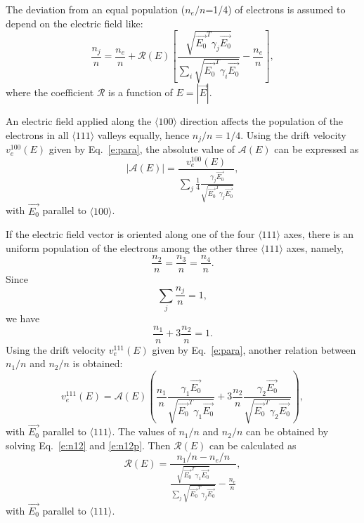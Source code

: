 \documentclass[epj]{svjour}
\begin{document}
The deviation from an equal population ($n_{e}/n$=1/4) of electrons is
assumed to depend on the electric field like:
\begin{equation} 
\label{e:nion} 
\frac{n_{j}}{n} = \frac{n_{e}}{n} + \mathcal{R}(E) 
\left[ \frac{\sqrt{\vec{E_{0}}^{T}\gamma_{j}\vec{E_{0}}}}
{\sum_{i}\sqrt{\vec{E_{0}}^{T}\gamma_{i}\vec{E_{0}}}} - 
\frac{n_{e}}{n} \right],  
\end{equation} 
where the coefficient $\mathcal{R}$ is a function of $E=|\vec{E}|$.
 
An electric field applied along the $\langle 100 \rangle$ direction
affects the population of the electrons in all $\langle 111 \rangle$
valleys equally, hence $n_{j}/n = 1/4$. Using the drift velocity
$v_{e}^{100}(E)$ given by Eq.~\ref{e:para}, the absolute value of
$\mathcal{A}(E)$ can be expressed as
\begin{equation} 
\label{e:ae} 
|\mathcal{A}(E)| = \frac{v_{e}^{100}(E)}  
{\displaystyle \sum_{j} \frac{1}{4} \frac{\gamma_{j}\vec{E_{0}}}
{\sqrt{\vec{E_{0}}^{T}\gamma_{j}\vec{E_{0}}}}}, 
\end{equation}
with $\vec{E_{0}}$ parallel to $\langle 100 \rangle$.
 
If the electric field vector is oriented along one of the four
$\langle 111 \rangle$ axes, there is an uniform population of the
electrons among the other three $\langle 111 \rangle$ axes, namely,
\begin{equation} 
\label{e:n111} 
\frac{n_{2}}{n} = \frac{n_{3}}{n} = \frac{n_{4}}{n}. 
\end{equation} 
Since 
\begin{equation} 
\label{e:nsum} 
\displaystyle \sum_{j}\frac{n_{j}}{n} = 1, 
\end{equation} 
we have 
\begin{equation} 
\label{e:n12} 
\frac{n_{1}}{n} + 3\frac{n_{2}}{n}= 1. 
\end{equation} 
Using the drift velocity $v_{e}^{111}(E)$ given by Eq.~\ref{e:para},
another relation between $n_{1}/n$ and $n_{2}/n$ is obtained:
\begin{equation} 
\label{e:n12p} 
v_{e}^{111}(E) =  \mathcal{A}(E) 
\left( \frac{n_{1}}{n} \frac{\gamma_{1}\vec{E_{0}}} 
{\sqrt{\vec{E_{0}}^{T}\gamma_{1}\vec{E_{0}}}} +  
3\frac{n_{2}}{n} \frac{\gamma_{2}\vec{E_{0}}}         
{\sqrt{\vec{E_{0}}^{T}\gamma_{2}\vec{E_{0}}}} \right), 
\end{equation}
with $\vec{E_{0}}$ parallel to $\langle 111 \rangle$. The values of
$n_{1}/n$ and $n_{2}/n$ can be obtained by solving Eq.~\ref{e:n12} and
\ref{e:n12p}. Then $\mathcal{R}(E)$ can be calculated as
\begin{equation} 
\label{e:re} 
\mathcal{R}(E) = \frac{n_{1}/n - n_{e}/n}
{\displaystyle \frac{\sqrt{\vec{E_{0}}^{T}\gamma_{1}\vec{E_{0}}}}
{\sum_{j}\sqrt{\vec{E_{0}}^{T}\gamma_{j}\vec{E_{0}}}} - 
\frac{n_{e}}{n}},
\end{equation} 
with $\vec{E_{0}}$ parallel to $\langle 111 \rangle$.
\end{document}
